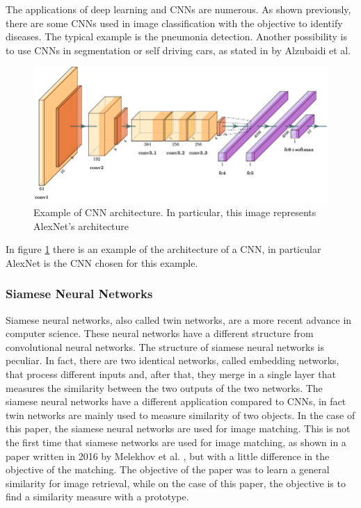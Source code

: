 \documentclass[conference]{IEEEtran}
\begin{document}
					\noindent The applications of deep learning and CNNs are numerous. As shown previously, there are some CNNs used in image classification with the objective to identify diseases. The typical example is 
					the pneumonia detection. Another possibility is to use CNNs in segmentation or self driving cars, as stated in \cite{alzubaidi2021review} by Alzubaidi et al.
			
					\begin{figure}[!ht]
						\centerline{\includegraphics[width=\linewidth]{imgs/cnn_architecture.png}}
						\caption{Example of CNN architecture. In particular, this image represents AlexNet's architecture}
						\label{fig:5}
					\end{figure}
					
					\noindent In figure \ref{fig:5} there is an example of the architecture of a CNN, in particular AlexNet is the CNN chosen for this example. 
					
				\subsubsection{Siamese Neural Networks}

					Siamese neural networks, also called twin networks, are a more recent advance in computer science. These neural networks have a different structure from convolutional neural networks. The 
					structure of siamese neural networks is peculiar. In fact, there are two identical networks, called embedding networks, that process different inputs and, after that, 
					they merge in a single layer that measures the similarity between 
					the two outputs of the two networks. The siamese neural networks have a different application compared to CNNs, in fact twin networks are mainly used to measure similarity of two objects. 
					In the case of this paper, the siamese neural networks are used for image matching. This is not the first time that siamese networks are used for image matching, as shown in a paper written in 2016 by 
					Melekhov et al. \cite{melekhov2016siamese}, but with a little difference in the objective of the matching. The objective of the paper was to learn a general similarity for image retrieval, while on the case of this 
					paper, the objective is to find a similarity measure with a prototype. 
					
\end{document}

